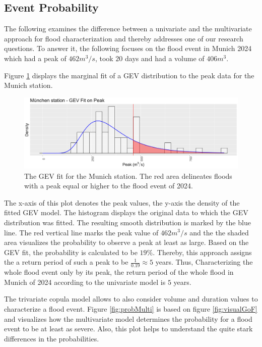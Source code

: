 \documentclass[
]{krantz}
\begin{document}
\subsection{Event Probability}\label{event-probability}

The following examines the difference between a univariate and the multivariate approach
for flood characterization and thereby addresses one of our research questions.
To answer it, the
following focuses on the flood event in Munich 2024
which had a peak of \(462m^3/s\), took \(20\) days and had a volume of \(406m^3\).

Figure \ref{fig:probUni} displays the marginal fit of a GEV distribution to the peak data for the Munich station.

\begin{figure}

{\centering \includegraphics[width=1\linewidth]{work/04-floodfreq/figures/app_univariate_hq} 

}

\caption{The GEV fit for the Munich station. The red area delineates floods with a peak equal or higher to the flood event of 2024.}\label{fig:probUni}
\end{figure}

The x-axis of this plot denotes the peak values, the y-axis the density of the fitted GEV model.
The histogram displays the original data to which the GEV distribution was fitted. The resulting smooth distribution
is marked by the blue line. The red vertical line marks the peak value of \(462m^3/s\) and
the the shaded area visualizes the probability
to observe a peak at least as large. Based on the GEV fit, the probability is calculated to be
\(19\%\). Thereby, this approach assigns the a
return period of such a peak to be \(\frac{1}{0.19} \approx5\) years.
Thus, Characterizing the whole flood event only by its peak,
the return period of the whole flood in Munich of 2024 according to the univariate model is \(5\) years.

The trivariate copula model allows to also consider volume and duration values to characterize a flood event.
Figure \ref{fig:probMulti} is based on figure \ref{fig:visualGoF} and visualizes
how the multivariate model determines the probability for a flood event to be at least as severe.
Also, this plot helps to understand the quite stark differences in the probabilities.
\end{document}
